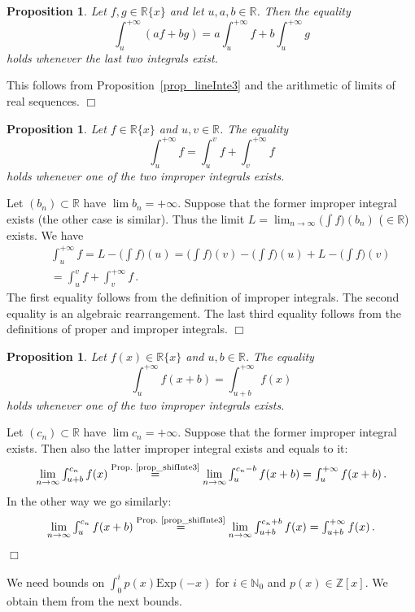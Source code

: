 \documentclass[10pt]{article}
\def\N{\mathbb{N}}
\def\Z{\mathbb{Z}}
\def\R{\mathbb{R}}
\def\proof{\par\noindent{\em Proof. }}
\def\eproof{\hfill{$\Box$}\bigskip}
\def\sus{\subset}
\newtheorem{prop}[thm]{Proposition}
\begin{document}
\begin{prop}\label{prop_linInt4}
Let $f,g\in\R\{x\}$ and let $u,a,b\in\R$. Then the equality
$${\textstyle
\int_u^{+\infty}(af+bg)=a\int_u^{+\infty}f+b\int_u^{+\infty}g
}
$$
holds whenever the last two integrals exist.
\end{prop}
\proof
This follows from Proposition~\ref{prop_lineInte3} and 
the arithmetic of limits of real sequences. 
\eproof

\begin{prop}\label{prop_addiInte4}
Let $f\in\R\{x\}$ and $u,v\in\R$. 
The equality
$${\textstyle
\int_u^{+\infty}f=\int_u^v f+\int_v^{+\infty}f
}
$$
holds whenever one of the two improper integrals exists.
\end{prop}
\proof
Let $(b_n)\sus\R$ have $\lim b_n=+\infty$. Suppose that the former improper integral 
exists (the other case is similar). Thus the limit 
$L=\lim_{n\to\infty}\big(\int f\big)(b_n)$ ($\in\R$) exists. We have
\begin{eqnarray*}
&&{\textstyle
\int_u^{+\infty}f=
L-\big(\int f\big)(u)=
\big(\int f\big)(v)-\big(\int f\big)(u)+L-\big(\int f\big)(v)}\\
&&{\textstyle
=\int_u^v f+\int_v^{+\infty}f\,.
}
\end{eqnarray*}
The first equality follows from the definition of improper integrals. The 
second equality is an algebraic rearrangement. The last third equality 
follows from the definitions of proper and improper integrals.
\eproof

\begin{prop}\label{prop_shift4}
Let $f(x)\in\R\{x\}$ and $u,b\in\R$. The equality
$${\textstyle
\int_u^{+\infty}f(x+b)=
\int_{u+b}^{+\infty}f(x)
}
$$
holds whenever one of the two improper integrals exists.
\end{prop}
\proof
Let $(c_n)\sus\R$ have $\lim c_n=+\infty$.
Suppose that the former improper integral exists. Then also the latter improper integral exists and equals to it:
$$
\lim_{n\to\infty}{\textstyle
\int_{u+b}^{c_n}f(x)}\stackrel{\text{Prop.~\ref{prop_shifInte3}}}{=} 
\lim_{n\to\infty}
{\textstyle
\int_u^{c_n-b}f(x+b)=\int_u^{+\infty}f(x+b)\,.
}
$$
In the other way we go similarly:
$$
\lim_{n\to\infty}{\textstyle
\int_u^{c_n}f(x+b)}
\stackrel{\text{Prop.~\ref{prop_shifInte3}}}{=} 
\lim_{n\to\infty}
{\textstyle
\int_{u+b}^{c_n+b}f(x)=
\int_{u+b}^{+\infty}f(x)\,.
}
$$
\eproof

We need bounds on 
$\int_0^i p(x)\mathrm{Exp}(-x)$ 
for $i\in\N_0$ and $p(x)\in\Z[x]$. We obtain them from the next bounds.
\end{document}

